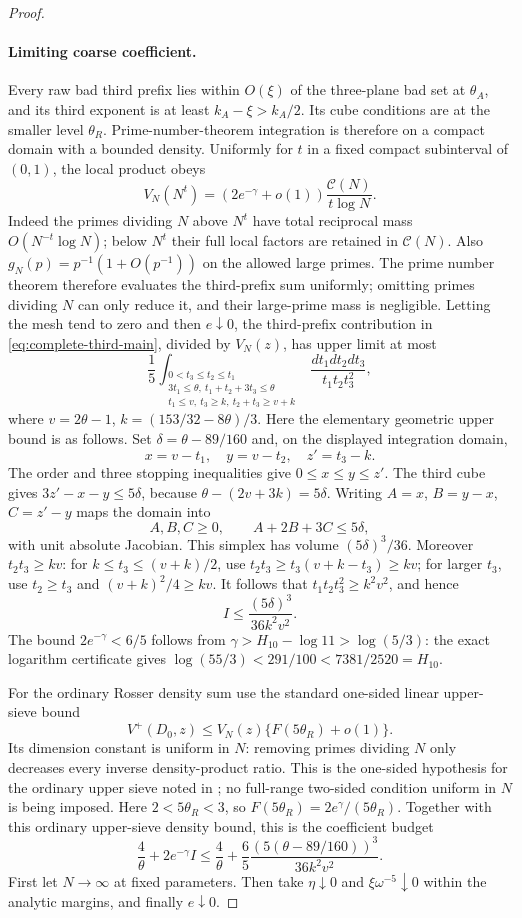 \documentclass[11pt]{article}
\newcommand{\CN}{\mathcal C(N)}
\begin{document}
\begin{proof}
\paragraph{Limiting coarse coefficient.}
Every raw bad third prefix lies within $O(\xi)$ of the three-plane
bad set at $\theta_A$, and its third exponent is at least
$k_A-\xi>k_A/2$. Its cube conditions are at the smaller level
$\theta_R$. Prime-number-theorem integration is therefore on a compact
domain with a bounded density. Uniformly for $t$ in a fixed compact subinterval
of $(0,1)$, the local product obeys
\[
 V_N(N^t)=(2e^{-\gamma}+o(1))\frac{\CN}{t\log N}.
\]
Indeed the primes dividing $N$ above $N^t$ have total reciprocal
mass $O(N^{-t}\log N)$; below $N^t$ their full local factors are
retained in $\CN$. Also $g_N(p)=p^{-1}(1+O(p^{-1}))$ on the
allowed large primes. The prime number theorem therefore evaluates
the third-prefix sum uniformly; omitting primes dividing $N$ can
only reduce it, and their large-prime mass is negligible.
Letting the mesh tend to zero and then
$e\downarrow0$, the third-prefix contribution in \eqref{eq:complete-third-main},
divided by $V_N(z)$, has upper limit at most
\[
 \frac15\int_{\substack{0<t_3\le t_2\le t_1\\
 3t_1\le\theta,\ t_1+t_2+3t_3\le\theta\\
 t_1\le v,\ t_3\ge k,\ t_2+t_3\ge v+k}}
 \frac{dt_1dt_2dt_3}{t_1t_2t_3^2},
\]
where $v=2\theta-1$, $k=(153/32-8\theta)/3$.
Here the elementary geometric upper bound is as follows. Set
$\delta=\theta-89/160$ and, on the displayed integration domain,
\[
 x=v-t_1,\quad y=v-t_2,\quad z'=t_3-k.
\]
The order and three stopping inequalities give
$0\le x\le y\le z'$. The third cube gives
$3z'-x-y\le5\delta$, because $\theta-(2v+3k)=5\delta$.
Writing $A=x$, $B=y-x$, $C=z'-y$ maps the domain into
\[
 A,B,C\ge0,\qquad A+2B+3C\le5\delta,
\]
with unit absolute Jacobian. This simplex has volume
$(5\delta)^3/36$. Moreover $t_2t_3\ge kv$: for
$k\le t_3\le(v+k)/2$, use
$t_2t_3\ge t_3(v+k-t_3)\ge kv$; for larger $t_3$, use
$t_2\ge t_3$ and $(v+k)^2/4\ge kv$.
It follows that $t_1t_2t_3^2\ge k^2v^2$, and hence
\[
 I\le\frac{(5\delta)^3}{36k^2v^2}.
\]
The bound $2e^{-\gamma}<6/5$ follows from
$\gamma>H_{10}-\log11>\log(5/3)$: the exact logarithm
certificate gives $\log(55/3)<291/100<7381/2520=H_{10}$.

For the ordinary Rosser density sum use the standard one-sided
linear upper-sieve bound
\[
 V^+(D_0,z)\le V_N(z)\{F(5\theta_R)+o(1)\}.
\]
Its dimension constant is uniform in $N$: removing primes dividing
$N$ only decreases every inverse density-product ratio. This is
the one-sided hypothesis for the ordinary upper sieve noted in
\cite[Remark 2.9]{Lichtman2025}; no full-range two-sided condition
uniform in $N$ is being imposed. Here $2<5\theta_R<3$, so
$F(5\theta_R)=2e^\gamma/(5\theta_R)$.
Together with this ordinary upper-sieve density bound,
this is the coefficient budget
\[
 \frac4\theta+2e^{-\gamma}I
 \le\frac4\theta+\frac65\frac{(5(\theta-89/160))^3}{36k^2v^2}.
\]
First let $N\to\infty$ at fixed parameters. Then take
$\eta\downarrow0$ and $\xi\omega^{-5}\downarrow0$ within the
analytic margins, and finally $e\downarrow0$.



\end{proof}
\end{document}
